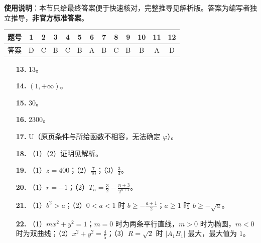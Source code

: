 
\begin{gknotice}
\textbf{使用说明}：本节只给最终答案便于快速核对，完整推导见解析版。答案为编写者独立推导，\textbf{非官方标准答案}。
\end{gknotice}

\begin{center}\begin{tabular}{ccccccccccccc}
\toprule
题号 & 1 & 2 & 3 & 4 & 5 & 6 & 7 & 8 & 9 & 10 & 11 & 12 \\
\midrule
答案 & D & C & B & C & B & A & B & C & B & B & A & D \\
\bottomrule
\end{tabular}\end{center}

\begin{itemize}[leftmargin=2.6em]
  \item[\textbf{13.}] $13$。
  \item[\textbf{14.}] $(1,+\infty)$。
  \item[\textbf{15.}] $30$。
  \item[\textbf{16.}] $2300$。
\end{itemize}

\begin{itemize}[leftmargin=2.6em]
  \item[\textbf{17.}] U（原页条件与所给函数不相容，无法确定 $\varphi$）。
  \item[\textbf{18.}] （1）（2）证明见解析。
  \item[\textbf{19.}] （1）$z=400$；（2）$\frac7{10}$；（3）$\frac34$。
  \item[\textbf{20.}] （1）$r=-1$；（2）$T_n=\frac32-\frac{n+3}{2^{n+1}}$。
  \item[\textbf{21.}] （1）$b^2>a$；（2）$0<a<1$ 时 $b\geqslant-\frac{a+1}{2}$；$a\geqslant1$ 时 $b\geqslant-\sqrt a$。
  \item[\textbf{22.}] （1）$mx^2+y^2=1$；$m=0$ 时为两条平行直线，$m>0$ 时为椭圆，$m<0$ 时为双曲线；（2）$x^2+y^2=\frac45$；（3）$R=\sqrt2$ 时 $|A_1B_1|$ 最大，最大值为 $1$。
\end{itemize}
